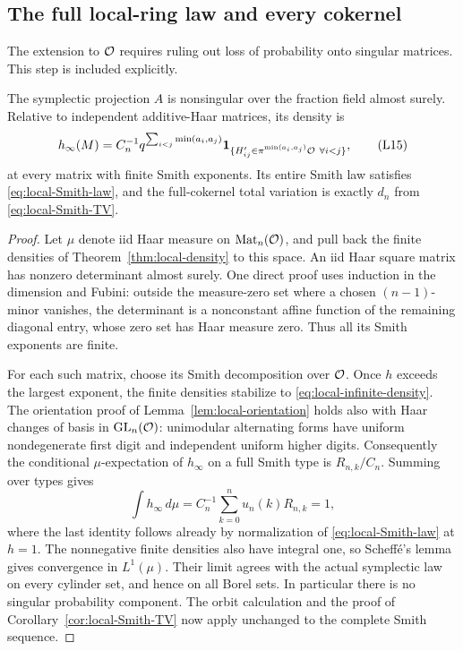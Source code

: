 \subsection{The full local-ring law and every cokernel}

The extension to \(\mathcal O\) requires ruling out loss of probability onto
singular matrices. This step is included explicitly.

\begin{proposition}\label{prop:local-infinity}
The symplectic projection \(A\) is nonsingular over the fraction field
almost surely. Relative to independent additive-Haar matrices, its
density is
\[
 h_\infty(M)=C_n^{-1}q^{\sum_{i<j}\min(a_i,a_j)}
 \mathbf 1_{\{H'_{ij}\in\pi^{\min(a_i,a_j)}\mathcal O\ \forall i<j\}},
 \tag{L15}\label{eq:local-infinite-density}
\]
at every matrix with finite Smith exponents. Its entire Smith law
satisfies \eqref{eq:local-Smith-law}, and the full-cokernel
total variation is exactly \(d_n\) from \eqref{eq:local-Smith-TV}.
\end{proposition}

\begin{proof}
Let \(\mu\) denote iid Haar measure on \(\operatorname{Mat}_n(\mathcal O)\), and pull back
the finite densities of Theorem~\ref{thm:local-density} to this space.
An iid Haar square matrix has nonzero determinant almost surely.
One direct proof uses induction in the dimension and Fubini:
outside the measure-zero set where a chosen \((n-1)\)-minor vanishes,
the determinant is a nonconstant affine function of the remaining
diagonal entry, whose zero set has Haar measure zero.
Thus all its Smith exponents are finite.

For each such matrix, choose its Smith decomposition over \(\mathcal O\).
Once \(h\) exceeds the largest exponent, the finite densities
stabilize to \eqref{eq:local-infinite-density}.
The orientation proof of Lemma~\ref{lem:local-orientation} holds
also with Haar changes of basis in \(\operatorname{GL}_n(\mathcal O)\):
unimodular alternating forms have uniform nondegenerate first digit
and independent uniform higher digits.
Consequently the conditional \(\mu\)-expectation of \(h_\infty\)
on a full Smith type is \(R_{n,k}/C_n\).
Summing over types gives
\[
 \int h_\infty\,d\mu
  =C_n^{-1}\sum_{k=0}^n u_n(k)R_{n,k}=1,
\]
where the last identity follows already by normalization of
\eqref{eq:local-Smith-law} at \(h=1\).
The nonnegative finite densities also have integral one, so
Scheff\'e's lemma gives convergence in \(L^1(\mu)\).
Their limit agrees with the actual symplectic law on every cylinder
set, and hence on all Borel sets. In particular there is no
singular probability component. The orbit calculation and the
proof of Corollary~\ref{cor:local-Smith-TV} now apply unchanged
to the complete Smith sequence.
\end{proof}

